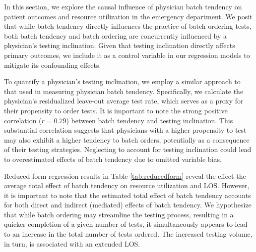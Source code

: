 \documentclass[,,nonblindrev]{informs}
\begin{document}
In this section, we explore the causal influence of physician batch
tendency on patient outcomes and resource utilization in the emergency
department. We posit that while batch tendency directly influences the
practice of batch ordering tests, both batch tendency and batch ordering
are concurrently influenced by a physician's testing inclination. Given
that testing inclination directly affects primary outcomes, we include
it as a control variable in our regression models to mitigate its
confounding effects.

To quantify a physician's testing inclination, we employ a similar
approach to that used in measuring physician batch tendency.
Specifically, we calculate the physician's residualized leave-out
average test rate, which serves as a proxy for their propensity to order
tests. It is important to note the strong positive correlation
(\(r = 0.79\)) between batch tendency and testing inclination. This
substantial correlation suggests that physicians with a higher
propensity to test may also exhibit a higher tendency to batch orders,
potentially as a consequence of their testing strategies. Neglecting to
account for testing inclination could lead to overestimated effects of
batch tendency due to omitted variable bias.

Reduced-form regression results in Table \ref{tab:reducedform} reveal
the effect the average total effect of batch tendency on resource
utilization and LOS. However, it is important to note that the estimated
total effect of batch tendency accounts for both direct and indirect
(mediated) effects of batch tendency. We hypothesize that while batch
ordering may streamline the testing process, resulting in a quicker
completion of a given number of tests, it simultaneously appears to lead
to an increase in the total number of tests ordered. The increased
testing volume, in turn, is associated with an extended LOS.
\end{document}
